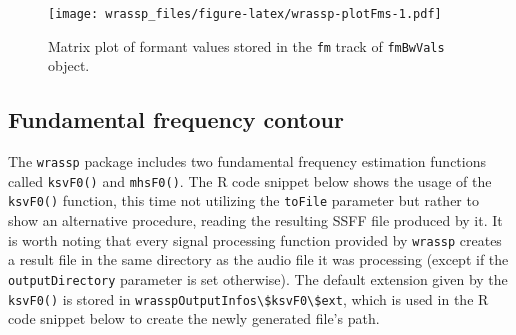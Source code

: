 \documentclass[]{book}
\newenvironment{Shaded}{\begin{snugshade}}{\end{snugshade}}
\newcommand{\CommentTok}[1]{\textcolor[rgb]{0.56,0.35,0.01}{\textit{#1}}}
\newcommand{\DataTypeTok}[1]{\textcolor[rgb]{0.13,0.29,0.53}{#1}}
\newcommand{\DecValTok}[1]{\textcolor[rgb]{0.00,0.00,0.81}{#1}}
\newcommand{\KeywordTok}[1]{\textcolor[rgb]{0.13,0.29,0.53}{\textbf{#1}}}
\newcommand{\NormalTok}[1]{#1}
\newcommand{\OperatorTok}[1]{\textcolor[rgb]{0.81,0.36,0.00}{\textbf{#1}}}
\newcommand{\StringTok}[1]{\textcolor[rgb]{0.31,0.60,0.02}{#1}}
\theoremstyle{definition}
\theoremstyle{definition}
\theoremstyle{definition}
\theoremstyle{remark}
\begin{document}
\begin{Shaded}
\end{Shaded}

\begin{figure}
\centering
\texttt{[image: wrassp\_files/figure-latex/wrassp-plotFms-1.pdf]}
\caption{\label{fig:wrassp-plotFms}Matrix plot of formant values stored in
the \texttt{fm} track of \texttt{fmBwVals} object.}
\end{figure}

\hypertarget{subsec:wrassp_f0}{%
\subsection{Fundamental frequency contour}\label{subsec:wrassp_f0}}

The \texttt{wrassp} package includes two fundamental frequency
estimation functions called \texttt{ksvF0()} and \texttt{mhsF0()}. The R
code snippet below shows the usage of the \texttt{ksvF0()} function,
this time not utilizing the \texttt{toFile} parameter but rather to show
an alternative procedure, reading the resulting SSFF file produced by
it. It is worth noting that every signal processing function provided by
\texttt{wrassp} creates a result file in the same directory as the audio
file it was processing (except if the \texttt{outputDirectory} parameter
is set otherwise). The default extension given by the \texttt{ksvF0()}
is stored in
\texttt{wrasspOutputInfos\textbackslash{}\$ksvF0\textbackslash{}\$ext},
which is used in the R code snippet below to create the newly generated
file's path.
\end{document}
